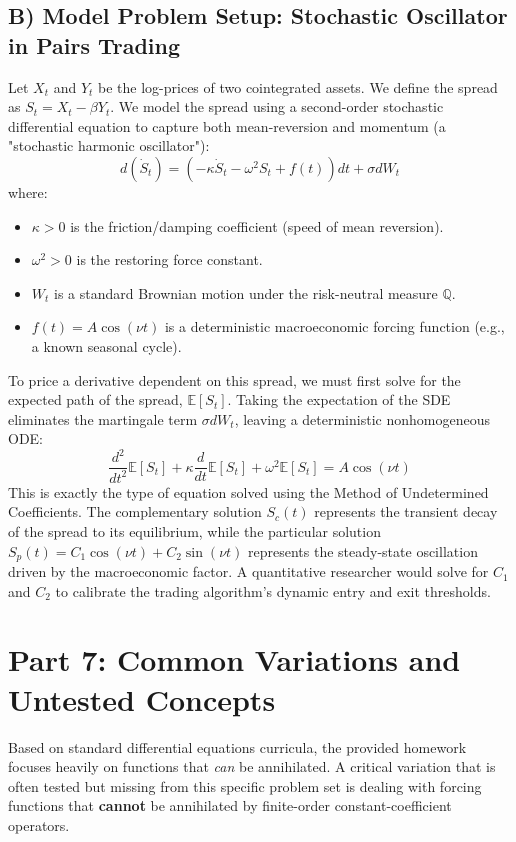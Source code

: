 \documentclass[11pt]{article}
\begin{document}
\subsection{B) Model Problem Setup: Stochastic Oscillator in Pairs Trading}
Let $X_t$ and $Y_t$ be the log-prices of two cointegrated assets. We define the spread as $S_t = X_t - \beta Y_t$. We model the spread using a second-order stochastic differential equation to capture both mean-reversion and momentum (a "stochastic harmonic oscillator"):
\[ d(\dot{S}_t) = (-\kappa \dot{S}_t - \omega^2 S_t + f(t)) dt + \sigma dW_t \]
where:
\begin{itemize}
    \item $\kappa > 0$ is the friction/damping coefficient (speed of mean reversion).
    \item $\omega^2 > 0$ is the restoring force constant.
    \item $W_t$ is a standard Brownian motion under the risk-neutral measure $\mathbb{Q}$.
    \item $f(t) = A \cos(\nu t)$ is a deterministic macroeconomic forcing function (e.g., a known seasonal cycle).
\end{itemize}
To price a derivative dependent on this spread, we must first solve for the expected path of the spread, $\mathbb{E}[S_t]$. Taking the expectation of the SDE eliminates the martingale term $\sigma dW_t$, leaving a deterministic nonhomogeneous ODE:
\[ \frac{d^2}{dt^2}\mathbb{E}[S_t] + \kappa \frac{d}{dt}\mathbb{E}[S_t] + \omega^2 \mathbb{E}[S_t] = A \cos(\nu t) \]
This is exactly the type of equation solved using the Method of Undetermined Coefficients. The complementary solution $S_c(t)$ represents the transient decay of the spread to its equilibrium, while the particular solution $S_p(t) = C_1 \cos(\nu t) + C_2 \sin(\nu t)$ represents the steady-state oscillation driven by the macroeconomic factor. A quantitative researcher would solve for $C_1$ and $C_2$ to calibrate the trading algorithm's dynamic entry and exit thresholds.

\newpage
\section{Part 7: Common Variations and Untested Concepts}

Based on standard differential equations curricula, the provided homework focuses heavily on functions that \textit{can} be annihilated. A critical variation that is often tested but missing from this specific problem set is dealing with forcing functions that \textbf{cannot} be annihilated by finite-order constant-coefficient operators.
\end{document}
